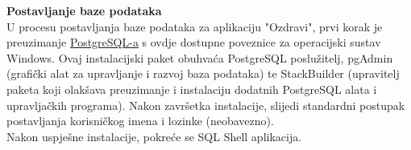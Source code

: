 			
	\textbf{Postavljanje baze podataka} \\		
	U procesu postavljanja baze podataka za aplikaciju "Ozdravi", prvi korak je preuzimanje 
	\href{https://www.postgresql.org/download/}{PostgreSQL-a} s ovdje dostupne poveznice za operacijski 
	sustav Windows. Ovaj instalacijski paket obuhvaća PostgreSQL poslužitelj, pgAdmin 
	(grafički alat za upravljanje i razvoj baza podataka) te StackBuilder (upravitelj paketa koji 
	olakšava preuzimanje i instalaciju dodatnih PostgreSQL alata i upravljačkih programa). Nakon završetka 
	instalacije, slijedi standardni postupak postavljanja korisničkog imena i lozinke (neobavezno). \\
	Nakon uspješne instalacije, pokreće se SQL Shell aplikacija.	\\
	
